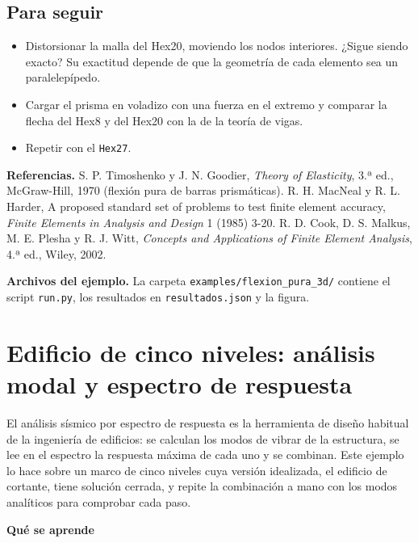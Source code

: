 \documentclass[11pt,oneside]{report}
\renewcommand{\chaptermark}[1]{\markboth{Cap.\ \thechapter\ ---\ #1}{}}
\begin{document}
\section{Para seguir}

\begin{itemize}
  \item Distorsionar la malla del Hex20, moviendo los nodos interiores. ¿Sigue siendo exacto? Su exactitud depende de que la geometría de cada elemento sea un paralelepípedo.
  \item Cargar el prisma en voladizo con una fuerza en el extremo y comparar la flecha del Hex8 y del Hex20 con la de la teoría de vigas.
  \item Repetir con el \texttt{Hex27}.
\end{itemize}

\textbf{Referencias.} S. P. Timoshenko y J. N. Goodier, \textit{Theory of Elasticity}, 3.ª ed., McGraw-Hill, 1970 (flexión pura de barras prismáticas). R. H. MacNeal y R. L. Harder, \textquotedbl{}A proposed standard set of problems to test finite element accuracy\textquotedbl{}, \textit{Finite Elements in Analysis and Design} 1 (1985) 3-20. R. D. Cook, D. S. Malkus, M. E. Plesha y R. J. Witt, \textit{Concepts and Applications of Finite Element Analysis}, 4.ª ed., Wiley, 2002.

\textbf{Archivos del ejemplo.} La carpeta \texttt{examples/\allowbreak{}flexion\_\allowbreak{}pura\_\allowbreak{}3d/\allowbreak{}} contiene el script \texttt{run.py}, los resultados en \texttt{resultados.json} y la figura.


\newpage

\chapter{Edificio de cinco niveles: análisis modal y espectro de respuesta}
\chaptermark{Edificio de cinco niveles}
\label{cap:edificio_espectro}





El análisis sísmico por espectro de respuesta es la herramienta de diseño habitual de la ingeniería de edificios: se calculan los modos de vibrar de la estructura, se lee en el espectro la respuesta máxima de cada uno y se combinan. Este ejemplo lo hace sobre un marco de cinco niveles cuya versión idealizada, el edificio de cortante, tiene solución cerrada, y repite la combinación a mano con los modos analíticos para comprobar cada paso.

\textbf{Qué se aprende}
\end{document}
